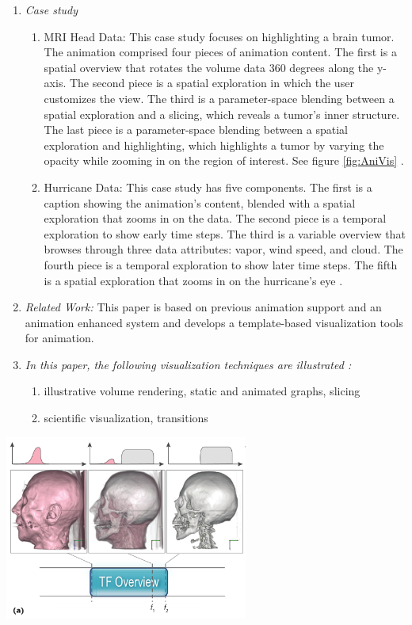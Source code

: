 \documentclass{egpubl}
\begin{document}
\begin{enumerate}
\item \textit{Case study}
\begin{enumerate}
\item MRI Head Data: This case study focuses on highlighting a brain tumor. The animation comprised four pieces of animation content. The first is a spatial overview that rotates the volume data 360 degrees along the y-axis. The second piece is a spatial exploration in which the user customizes the view. The third is a parameter-space blending between a spatial exploration and a slicing, which reveals a tumor's inner structure.  The last piece is a parameter-space blending between a spatial exploration and highlighting, which highlights a tumor by varying the opacity while zooming in on the region of interest. See figure \ref{fig:AniVis} \cite{Akiba}.
\item Hurricane Data: This case study  has five components. The first is a caption showing the animation's content, blended with a spatial exploration that zooms in on the data. The second piece is a temporal exploration to show early time steps. The third is a variable overview that browses through three data attributes: vapor, wind speed, and cloud. The fourth piece is a temporal exploration to show later time steps. The fifth is a spatial exploration that zooms in on the hurricane's eye \cite{Akiba}.
\end{enumerate}
\item \textit{Related Work:}  This paper is based on previous animation support \cite{childs} and an animation enhanced system \cite{correa} and develops a template-based visualization tools for animation. 
\item \textit{In this paper, the following visualization techniques are illustrated :} 
\begin{enumerate}
\item illustrative volume rendering, static and animated graphs, slicing
\item scientific visualization, transitions
\end{enumerate}
\end{enumerate}


\begingroup
\centering
\includegraphics[width=8cm]{./images/AniVis}
\label{fig:AniVis}
\endgroup
\end{document}
